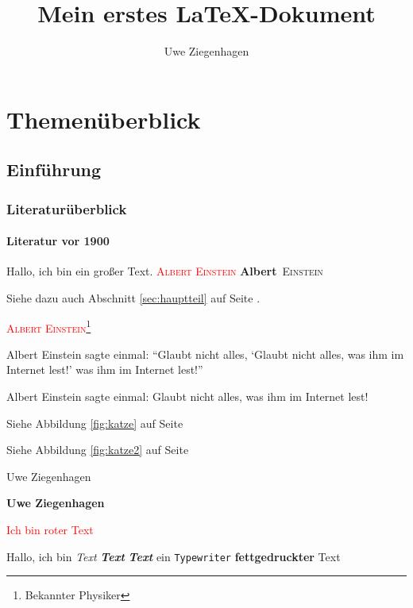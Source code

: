 \documentclass[12pt,ngerman,parskip=half]{scrreprt} %
\author{Uwe Ziegenhagen}
\title{Mein erstes \LaTeX-Dokument}
\newcommand{\person}[1]{\textcolor{red}{\textsc{#1}}}
\newcommand{\pperson}[2]{\textbf{#1}~\textsc{#2}}
\begin{document}
\maketitle

\tableofcontents

\listoffigures

\listoftables

\chapter{Themenüberblick}

\section{Einführung}
\subsection{Literaturüberblick}
\subsubsection{Literatur vor 1900}

Hallo, ich {\tiny bin} ein {\Huge großer} Text. \person{Albert Einstein} \pperson{Albert}{Einstein} 

Siehe dazu auch Abschnitt \ref{sec:hauptteil} auf Seite \pageref{sec:hauptteil}.

\person{Albert Einstein}\footnote{Bekannter Physiker}

Albert Einstein sagte einmal: \enquote{Glaubt nicht alles, \enquote{Glaubt nicht alles, was ihm im Internet lest!} was ihm im Internet lest!}

Albert Einstein sagte einmal: \glqq Glaubt nicht alles, was ihm im Internet lest!\grqq

Siehe Abbildung \ref{fig:katze}  auf Seite \pageref{fig:katze}

Siehe Abbildung \ref{fig:katze2}  auf Seite \pageref{fig:katze2}

\textmd{Uwe Ziegenhagen}

\textbf{Uwe Ziegenhagen}

\textcolor{red}{Ich bin roter Text}

Hallo, ich bin \textit{Text} \textit{\textbf{Text}} \textbf{\textit{Text}}   ein \texttt{Typewriter} \textbf{fettgedruckter} Text

\blindtext \clearpage
\end{document}

